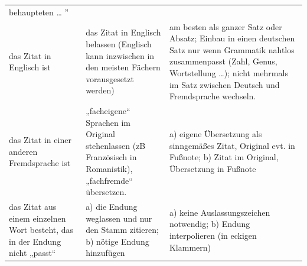 \documentclass[]{book}
\theoremstyle{definition}
\theoremstyle{definition}
\theoremstyle{definition}
\theoremstyle{remark}
\begin{document}
\begin{longtable}[]{@{}lll@{}}
\begin{minipage}[t]{0.32\columnwidth}
behaupteten \ldots{} '' \vspace{-6mm}\strut
\end{minipage}\tabularnewline
\begin{minipage}[t]{0.25\columnwidth}\raggedright\strut
das Zitat in Englisch ist\strut
\end{minipage} & \begin{minipage}[t]{0.34\columnwidth}\raggedright\strut
das Zitat in Englisch belassen (Englisch kann inzwischen in den meisten
Fächern vorausgesetzt werden)\strut
\end{minipage} & \begin{minipage}[t]{0.32\columnwidth}\raggedright\strut
am besten als ganzer Satz oder Absatz; Einbau in einen deutschen Satz
nur wenn Grammatik nahtlos zusammenpasst (Zahl, Genus, Wortstellung
\ldots{}); nicht mehrmals im Satz zwischen Deutsch und Fremdsprache
wechseln. \vspace{-6mm}\strut
\end{minipage}\tabularnewline
\begin{minipage}[t]{0.25\columnwidth}\raggedright\strut
das Zitat in einer anderen Fremdsprache ist\strut
\end{minipage} & \begin{minipage}[t]{0.34\columnwidth}\raggedright\strut
„facheigene`` Sprachen im Original stehenlassen (zB Französisch in
Romanistik), „fachfremde`` übersetzen.\strut
\end{minipage} & \begin{minipage}[t]{0.32\columnwidth}\raggedright\strut
a) eigene Übersetzung als sinngemäßes Zitat, Original evt. in Fußnote;
b) Zitat im Original, Übersetzung in Fußnote \vspace{-6mm}\strut
\end{minipage}\tabularnewline
\begin{minipage}[t]{0.25\columnwidth}\raggedright\strut
das Zitat aus einem einzelnen Wort besteht, das in der Endung nicht
„passt``\strut
\end{minipage} & \begin{minipage}[t]{0.34\columnwidth}\raggedright\strut
a) die Endung weglassen und nur den Stamm zitieren; b) nötige Endung
hinzufügen\strut
\end{minipage} & \begin{minipage}[t]{0.32\columnwidth}\raggedright\strut
a) keine Auslassungszeichen notwendig; b) Endung interpolieren (in
eckigen Klammern) \vspace{-6mm}\strut
\end{minipage}\tabularnewline

\end{longtable}
\end{document}
